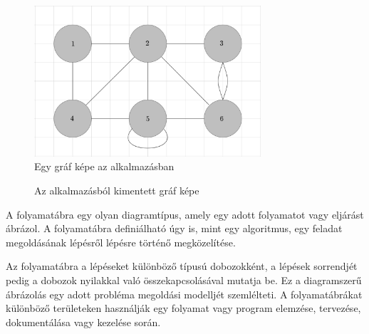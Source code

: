 \begin{figure}[!h]
	\label{fig:graph_editor}
	\centering
	\includegraphics[width=0.75\textwidth]{images/graph.png}
	\caption{Egy gráf képe az alkalmazásban}
\end{figure}

\begin{figure}[!h]
	\label{fig:graph_tikz}
	\centering
	
	\caption{Az alkalmazásból kimentett gráf képe}
\end{figure}


A folyamatábra egy olyan diagramtípus, amely egy adott folyamatot vagy eljárást ábrázol. A folyamatábra definiálható úgy is, mint egy algoritmus, egy feladat megoldásának lépésről lépésre történő megközelítése.

Az folyamatábra a lépéseket különböző típusú dobozokként, a lépések sorrendjét pedig a dobozok nyilakkal való összekapcsolásával mutatja be. Ez a diagramszerű ábrázolás egy adott probléma megoldási modelljét szemlélteti. A folyamatábrákat különböző területeken használják egy folyamat vagy program elemzése, tervezése, dokumentálása vagy kezelése során.

